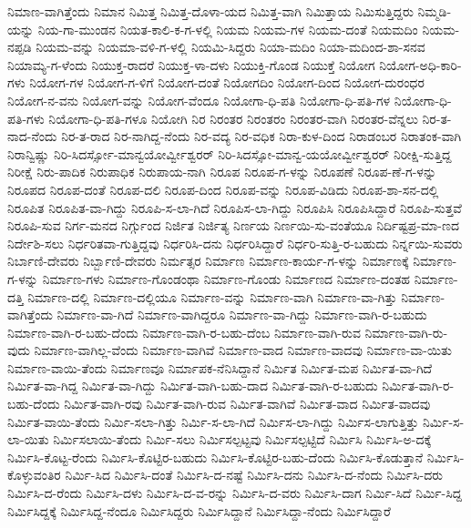ನಿಮಾಣ-ವಾಗಿತ್ತೆಂದು
ನಿಮಾನ
ನಿಮಿತ್ತ
ನಿಮಿತ್ತ-ದೊಳಾ-ಯದ
ನಿಮಿತ್ತ-ವಾಗಿ
ನಿಮಿತ್ತಾಯ
ನಿಮಿಸುತ್ತಿದ್ದರು
ನಿಮ್ಮಡಿ-ಯನ್ನು
ನಿಯ-ಗಾ-ಮುಂಡನ
ನಿಯತ-ಕಾಲಿ-ಕ-ಗ-ಳಲ್ಲಿ
ನಿಯಮ
ನಿಯಮ-ಗಳ
ನಿಯಮ-ದಂತೆ
ನಿಯಮದಿಂ
ನಿಯಮ-ನಪ್ಪಡಿ
ನಿಯಮ-ವನ್ನು
ನಿಯಮಾ-ವಳಿ-ಗ-ಳಲ್ಲಿ
ನಿಯಮಿ-ಸಿದ್ದರು
ನಿಯಾ-ಮದಿಂ
ನಿಯಾ-ಮದಿಂದ-ಶಾ-ಸನವ
ನಿಯಾಮ್ಯ-ಗ-ಳೆಂದು
ನಿಯುಕ್ತ-ರಾದರೆ
ನಿಯುಕ್ತ-ಳಾ-ದಳು
ನಿಯುಕ್ತಿ-ಗೊಂಡ
ನಿಯುಕ್ತೆ
ನಿಯೋಗ
ನಿಯೋಗ-ಅಧಿ-ಕಾರಿ-ಗಳು
ನಿಯೋಗ-ಗಳ
ನಿಯೋಗ-ಗ-ಳಿಗೆ
ನಿಯೋಗ-ದಂತೆ
ನಿಯೋಗದಿಂ
ನಿಯೋಗ-ದಿಂದ
ನಿಯೋಗ-ದುರಂಧರ
ನಿಯೋಗ-ನ-ವನು
ನಿಯೋಗ-ವನ್ನು
ನಿಯೋಗ-ವೆಂದೂ
ನಿಯೋಗಾ-ಧಿ-ಪತಿ
ನಿಯೋಗಾ-ಧಿ-ಪತಿ-ಗಳ
ನಿಯೋಗಾ-ಧಿ-ಪತಿ-ಗಳು
ನಿಯೋಗಾ-ಧಿ-ಪತಿ-ಗಳೂ
ನಿಯೋಗಿ
ನಿರ
ನಿರಂತರ
ನಿರಂತರಂ
ನಿರಂತರ-ವಾಗಿ
ನಿರಂತರ-ವೆನ್ನಲು
ನಿರ-ತ-ನಾದ-ನೆಂದು
ನಿರ-ತ-ರಾದ
ನಿರ-ನಾಗಿದ್ದ-ನೆಂದು
ನಿರ-ವದ್ಯ
ನಿರ-ವಧಿಕ
ನಿರಾ-ಕುಳ-ದಿಂದ
ನಿರಾಡಂಬರ
ನಿರಾತಂಕ-ವಾಗಿ
ನಿರಾನ್ವಿಷ್ಣು
ನಿರಿ-ಸಿದರ್ಸ್ಸೋ-ಮಾನ್ವಯೋರ್ವ್ವೀಶ್ವರರ್
ನಿರಿ-ಸಿದಸ್ಸೋ-ಮಾನ್ವ-ಯಯೋರ್ವ್ವೀಶ್ವರರ್
ನಿರೀಕ್ಷಿ-ಸುತ್ತಿದ್ದ
ನಿರೀಕ್ಷೆ
ನಿರು-ಪಾದಿಕ
ನಿರುಪಾಧಿಕ
ನಿರುಪಾಯ-ನಾಗಿ
ನಿರೂಪ
ನಿರೂಪ-ಗ-ಳನ್ನು
ನಿರೂಪಣೆ
ನಿರೂಪ-ಣೆ-ಗ-ಳನ್ನು
ನಿರೂಪದ
ನಿರೂಪ-ದಂತೆ
ನಿರೂಪ-ದಲಿ
ನಿರೂಪ-ದಿಂದ
ನಿರೂಪ-ವನ್ನು
ನಿರೂಪ-ವಿಡಿದು
ನಿರೂಪ-ಶಾ-ಸನ-ದಲ್ಲಿ
ನಿರೂಪಿತ
ನಿರೂಪಿತ-ವಾ-ಗಿದ್ದು
ನಿರೂಪಿ-ಸ-ಲಾ-ಗಿದೆ
ನಿರೂಪಿಸ-ಲಾ-ಗಿದ್ದು
ನಿರೂಪಿಸಿ
ನಿರೂಪಿಸಿದ್ದಾರೆ
ನಿರೂಪಿ-ಸುತ್ತವೆ
ನಿರೂಪಿ-ಸುವ
ನಿರ್ಗ-ಮನದ
ನಿರ್ಗ್ಗುಂದ
ನಿರ್ಜಿತ
ನಿರ್ಜಿತ್ಯ
ನಿರ್ಣಯ
ನಿರ್ಣಯಿ-ಸು-ವಂತೆಯೂ
ನಿರ್ದಿಷ್ಟಪ್ರ-ಮಾ-ಣದ
ನಿರ್ದೇಶಿ-ಸಲು
ನಿರ್ಧರಿತವಾ-ಗುತ್ತಿದ್ದವು
ನಿರ್ಧರಿಸಿ-ದನು
ನಿರ್ಧರಿಸಿದ್ದಾರೆ
ನಿರ್ಧರಿ-ಸುತ್ತಿ-ರ-ಬಹುದು
ನಿರ್ನ್ನಯಿ-ಸುವರು
ನಿರ್ಬಾಣಿ-ದೇವರು
ನಿರ್ಬ್ಬಾಣಿ-ದೇವರು
ನಿರ್ಮತ್ಸರ
ನಿರ್ಮಾಣ
ನಿರ್ಮಾಣ-ಕಾರ್ಯ-ಗ-ಳನ್ನು
ನಿರ್ಮಾಣಕ್ಕೆ
ನಿರ್ಮಾಣ-ಗ-ಳನ್ನು
ನಿರ್ಮಾಣ-ಗಳು
ನಿರ್ಮಾಣ-ಗೊಂಡಂಥಾ
ನಿರ್ಮಾಣ-ಗೊಂಡು
ನಿರ್ಮಾಣದ
ನಿರ್ಮಾಣ-ದಂತಹ
ನಿರ್ಮಾಣ-ದತ್ತಿ
ನಿರ್ಮಾಣ-ದಲ್ಲಿ
ನಿರ್ಮಾಣ-ದಲ್ಲಿಯೂ
ನಿರ್ಮಾಣ-ವನ್ನು
ನಿರ್ಮಾಣ-ವಾಗಿ
ನಿರ್ಮಾಣ-ವಾ-ಗಿತ್ತು
ನಿರ್ಮಾಣ-ವಾಗಿತ್ತೆಂದು
ನಿರ್ಮಾಣ-ವಾ-ಗಿದೆ
ನಿರ್ಮಾಣ-ವಾಗಿದ್ದರೂ
ನಿರ್ಮಾಣ-ವಾ-ಗಿದ್ದು
ನಿರ್ಮಾಣ-ವಾಗಿ-ರ-ಬಹುದು
ನಿರ್ಮಾಣ-ವಾಗಿ-ರ-ಬಹು-ದೆಂದು
ನಿರ್ಮಾಣ-ವಾಗಿ-ರ-ಬಹು-ದೆಂಬ
ನಿರ್ಮಾಣ-ವಾಗಿ-ರುವ
ನಿರ್ಮಾಣ-ವಾಗಿ-ರು-ವುದು
ನಿರ್ಮಾಣ-ವಾಗಿಲ್ಲ-ವೆಂದು
ನಿರ್ಮಾಣ-ವಾಗಿವೆ
ನಿರ್ಮಾಣ-ವಾದ
ನಿರ್ಮಾಣ-ವಾದವು
ನಿರ್ಮಾಣ-ವಾ-ಯಿತು
ನಿರ್ಮಾಣ-ವಾಯಿ-ತೆಂದು
ನಿರ್ಮಾಣವೂ
ನಿರ್ಮಾಪಕ-ನೆನಿಸಿದ್ದಾನೆ
ನಿರ್ಮಿತ
ನಿರ್ಮಿತ-ಮಪ
ನಿರ್ಮಿತ-ವಾ-ಗಿದೆ
ನಿರ್ಮಿತ-ವಾ-ಗಿದ್ದ
ನಿರ್ಮಿತ-ವಾ-ಗಿದ್ದು
ನಿರ್ಮಿತ-ವಾಗಿ-ಬಹು-ದಾದ
ನಿರ್ಮಿತ-ವಾಗಿ-ರ-ಬಹುದು
ನಿರ್ಮಿತ-ವಾಗಿ-ರ-ಬಹು-ದೆಂದು
ನಿರ್ಮಿತ-ವಾಗಿ-ರವು
ನಿರ್ಮಿತ-ವಾಗಿ-ರುವ
ನಿರ್ಮಿತ-ವಾಗಿವೆ
ನಿರ್ಮಿತ-ವಾದ
ನಿರ್ಮಿತ-ವಾದವು
ನಿರ್ಮಿತ-ವಾಯಿ-ತೆಂದು
ನಿರ್ಮಿ-ಸಲಾ-ಗಿತ್ತು
ನಿರ್ಮಿ-ಸ-ಲಾ-ಗಿದೆ
ನಿರ್ಮಿಸ-ಲಾ-ಗಿದ್ದು
ನಿರ್ಮಿಸ-ಲಾಗುತ್ತಿತ್ತು
ನಿರ್ಮಿ-ಸ-ಲಾ-ಯಿತು
ನಿರ್ಮಿಸಲಾಯಿ-ತೆಂದು
ನಿರ್ಮಿ-ಸಲು
ನಿರ್ಮಿಸಲ್ಪಟ್ಟವು
ನಿರ್ಮಿಸಲ್ಪಟ್ಟಿದೆ
ನಿರ್ಮಿಸಿ
ನಿರ್ಮಿಸಿ-ಅ-ದಕ್ಕೆ
ನಿರ್ಮಿಸಿ-ಕೊಟ್ಟ-ರೆಂದು
ನಿರ್ಮಿಸಿ-ಕೊಟ್ಟಿರ-ಬಹುದು
ನಿರ್ಮಿಸಿ-ಕೊಟ್ಟಿರ-ಬಹು-ದೆಂದು
ನಿರ್ಮಿಸಿ-ಕೊಡುತ್ತಾನೆ
ನಿರ್ಮಿಸಿ-ಕೊಳ್ಳುವಂತಿರ
ನಿರ್ಮಿ-ಸಿದ
ನಿರ್ಮಿಸಿ-ದಂತೆ
ನಿರ್ಮಿಸಿ-ದ-ನಷ್ಟೆ
ನಿರ್ಮಿಸಿ-ದನು
ನಿರ್ಮಿಸಿ-ದ-ನೆಂದು
ನಿರ್ಮಿಸಿ-ದರು
ನಿರ್ಮಿಸಿ-ದ-ರೆಂದು
ನಿರ್ಮಿಸಿ-ದಳು
ನಿರ್ಮಿಸಿ-ದ-ವ-ರನ್ನು
ನಿರ್ಮಿಸಿ-ದ-ವರು
ನಿರ್ಮಿಸಿ-ದಾಗ
ನಿರ್ಮಿ-ಸಿದೆ
ನಿರ್ಮಿ-ಸಿದ್ದ
ನಿರ್ಮಿಸಿದ್ದಕ್ಕೆ
ನಿರ್ಮಿಸಿದ್ದ-ನೆಂದೂ
ನಿರ್ಮಿಸಿದ್ದರು
ನಿರ್ಮಿಸಿದ್ದಾನೆ
ನಿರ್ಮಿಸಿದ್ದಾ-ನೆಂದು
ನಿರ್ಮಿಸಿದ್ದಾರೆ
